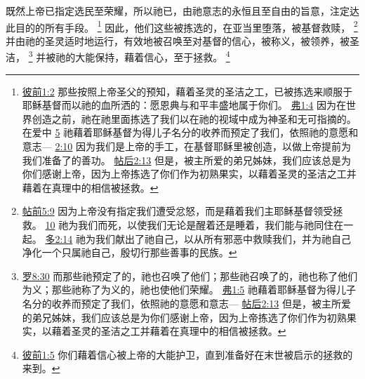 \documentclass[12pt, a4paper, oneside]{ctexart}
\newcounter{parnum}[section]
\newcommand{\N}{%
   \noindent\refstepcounter{parnum}%
    \makebox[\parindent][l]{\textbf{\arabic{parnum}.}}}
\begin{document}
	
\N 既然上帝已指定选民至荣耀，所以祂已，由祂意志的永恒且至自由的旨意，注定达此目的的所有手段。
	\footnote {
		\href{https://biblehub.com/1_peter/1-2.htm}{彼前1:2} 那些按照上帝圣父的预知，藉着圣灵的圣洁之工，已被拣选来顺服于耶稣基督而以祂的血所洒的：愿恩典与和平丰盛地属于你们。
		\href{https://biblehub.com/ephesians/1-4.htm}{弗1:4} 因为在世界创造之前，祂在祂里面拣选了我们以在祂的视域中成为神圣和无可指摘的。在爱中
		\href{https://biblehub.com/ephesians/1-5.htm}{5} 祂藉着耶稣基督为得儿子名分的收养而预定了我们，依照祂的意愿和意志---
		\href{https://biblehub.com/ephesians/2-10.htm}{2:10} 因为我们是上帝的手工，在基督耶稣里被创造，以做上帝提前为我们准备了的善功。
		\href{https://biblehub.com/2_thessalonians/2-13.htm}{帖后2:13} 但是，被主所爱的弟兄姊妹，我们应该总是为你们感谢上帝，因为上帝拣选了你们作为初熟果实，以藉着圣灵的圣洁之工并藉着在真理中的相信被拯救。
	}
	因此，他们这些被拣选的，在亚当里堕落，被基督救赎，
	\footnote {
		\href{https://biblehub.com/1_thessalonians/5-9.htm}{帖前5:9} 因为上帝没有指定我们遭受忿怒，而是藉着我们主耶稣基督领受拯救。
		\href{https://biblehub.com/1_thessalonians/5-10.htm}{10} 祂为我们而死，以使我们无论是醒着还是睡着，我们能与祂同住在一起。
		\href{https://biblehub.com/titus/2-14.htm}{多2:14} 祂为我们献出了祂自己，以从所有邪恶中救赎我们，并为祂自己净化一个只属祂自己，殷切行那些善事的民族。
	}
	并由祂的圣灵适时地运行，有效地被召唤至对基督的信心，被称义，被领养，被圣洁，
	\footnote {
		\href{https://biblehub.com/romans/8-30.htm}{罗8:30} 而那些祂预定了的，祂也召唤了他们；那些祂召唤了的，祂也称了他们为义；那些祂称了为义的，祂也使他们荣耀。
		\href{https://biblehub.com/ephesians/1-5.htm}{弗1:5} 祂藉着耶稣基督为得儿子名分的收养而预定了我们，依照祂的意愿和意志---
		\href{https://biblehub.com/2_thessalonians/2-13.htm}{帖后2:13} 但是，被主所爱的弟兄姊妹，我们应该总是为你们感谢上帝，因为上帝拣选了你们作为初熟果实，以藉着圣灵的圣洁之工并藉着在真理中的相信被拯救。
	}
	并被祂的大能保持，藉着信心，至于拯救。
	\footnote {
		\href{https://biblehub.com/1_peter/1-5.htm}{彼前1:5} 你们藉着信心被上帝的大能护卫，直到准备好在末世被启示的拯救的来到。
	}
\end{document}
